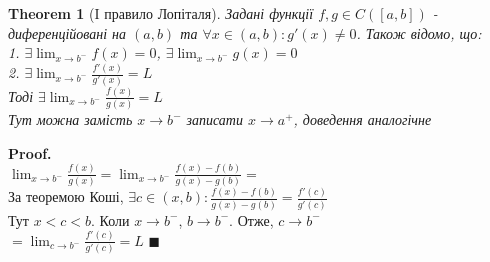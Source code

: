 \documentclass[a4paper, 14pt]{extarticle}
\def\huge{\displaystyle}
\theoremstyle{theoremdd}
\newtheorem{theorem}{Theorem}[subsection]
\theoremstyle{theoremdd}
\theoremstyle{theoremdd}
\theoremstyle{theoremdd}
\theoremstyle{theoremdd}
\theoremstyle{theoremdd}
\theoremstyle{theoremdd}
\theoremstyle{theoremdd}
\newenvironment{pf}{\vspace*{-3mm} \textbf{Proof. \\}}{$\blacksquare$}
\begin{document}
\begin{theorem}[I правило Лопіталя]
Задані функції $f,g \in C([a,b])$ - диференційовані на $(a,b)$ та $\forall x \in (a,b): g'(x) \neq 0$. Також відомо, що:\\
1. $\exists \huge \lim_{x \to b^-} f(x) = 0$, $\exists \huge \lim_{x \to b^-} g(x) = 0$\\
2. $\exists \huge \lim_{x \to b^-} \frac{f'(x)}{g'(x)} = L$\\
Тоді $\exists \huge \lim_{x \to b^-} \frac{f(x)}{g(x)} = L$\\
\textit{Тут можна замість $x \to b^-$ записати $x \to a^+$, доведення аналогічне}
\end{theorem}

\begin{pf}
$\huge \lim_{x \to b^-} \frac{f(x)}{g(x)} = \lim_{x \to b^-} \frac{f(x)-f(b)}{g(x)-g(b)} =$\\
За теоремою Коші, $\exists c \in (x, b): \huge \frac{f(x)-f(b)}{g(x)-g(b)} = \frac{f'(c)}{g'(c)}$\\
Тут $x < c < b$. Коли $x \to b^-$, $b \to b^-$. Отже, $c \to b^-$\\
$= \huge \lim_{c \to b^-} \frac{f'(c)}{g'(c)} = L$
\end{pf}
\end{document}
